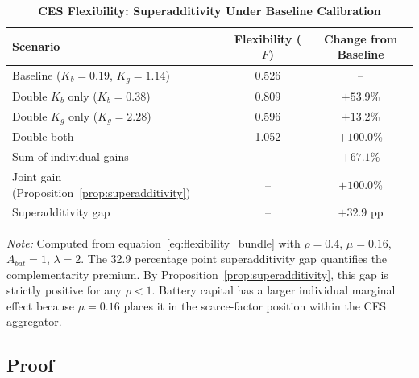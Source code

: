 \documentclass[12pt, a4paper]{article}
\begin{document}
	\begin{table}[H]
		\centering
		\caption{\textbf{CES Flexibility: Superadditivity Under Baseline Calibration}}
		\label{tab:ces_complementarity}
		\renewcommand{\arraystretch}{1.3}
		\small
		\begin{tabular}{l c c}
			\toprule
			\textbf{Scenario} & \textbf{Flexibility ($F$)} & \textbf{Change from Baseline} \\
			\midrule
			Baseline ($K_b = 0.19$, $K_g = 1.14$) & 0.526 & -- \\
			Double $K_b$ only ($K_b = 0.38$) & 0.809 & $+53.9$\% \\
			Double $K_g$ only ($K_g = 2.28$) & 0.596 & $+13.2$\% \\
			Double both & 1.052 & $+100.0$\% \\
			\midrule
			Sum of individual gains & -- & $+67.1$\% \\
			Joint gain (Proposition~\ref{prop:superadditivity}) & -- & $+100.0$\% \\
			Superadditivity gap & -- & $+32.9$ pp \\
			\bottomrule
		\end{tabular}
		\vspace{0.2cm}
		\parbox{\textwidth}{\footnotesize \textit{Note:} Computed from equation~\eqref{eq:flexibility_bundle} with $\rho = 0.4$, $\mu = 0.16$, $A_{bat} = 1$, $\lambda = 2$. The 32.9 percentage point superadditivity gap quantifies the complementarity premium. By Proposition~\ref{prop:superadditivity}, this gap is strictly positive for any $\rho < 1$. Battery capital has a larger individual marginal effect because $\mu = 0.16$ places it in the scarce-factor position within the CES aggregator.}
	\end{table}

	\subsection{Proof}
\end{document}

